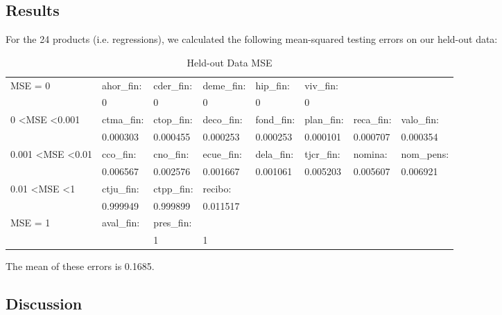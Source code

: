 \documentclass{article}
\begin{document}
\begin{spacing}{1}
\begin{large}
\subsection{Results}

For the 24 products (i.e. regressions), we calculated the following mean-squared testing errors on our held-out data:

\begin{table}[h]\footnotesize
	\centering
	\caption{Held-out Data MSE}
	\label{my-label}
	\begin{tabular}{llllllll}
		\hline
		MSE = 0                            & ahor\_fin:  & cder\_fin: & deme\_fin: & hip\_fin:  & viv\_fin:  &                     &            \\
		& 0                    & 0          & 0          & 0          & 0          &                     &            \\ \hline
		0 \textless MSE \textless 0.001      & ctma\_fin:          & ctop\_fin: & deco\_fin: & fond\_fin: & plan\_fin: & reca\_fin:  & valo\_fin: \\
		& 0.000303            & 0.000455   & 0.000253   & 0.000253   & 0.000101   &  0.000707             & 0.000354   \\ \hline
		0.001 \textless MSE \textless 0.01 & cco\_fin:           & cno\_fin:  & ecue\_fin: & dela\_fin: & tjcr\_fin: & nomina:             & nom\_pens: \\
		& 0.006567            & 0.002576   & 0.001667   & 0.001061   & 0.005203   & 0.005607            & 0.006921   \\ \hline
		0.01 \textless MSE \textless 1     & ctju\_fin:          & ctpp\_fin: & recibo:    &            &            &                     &            \\
		& 0.999949            & 0.999899   & 0.011517   &            &            &                     &            \\ \hline
		MSE = 1                            & aval\_fin:          & pres\_fin: &            &            &            &                     &\\
		&                    & 1          &1           &            &            &                     & \\
		\hline
	\end{tabular}
\end{table}
The mean of these errors is 0.1685.

\subsection{Discussion}


\end{large}
\end{spacing}
\end{document}
